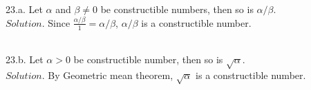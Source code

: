\documentclass[12pt]{book}
\begin{document}
\begin{CJK}{UTF8}{bsmi}
23.a. Let $\alpha$ and $\beta\ne0$ be constructible numbers, then so is $\alpha/\beta$. \\
$Solution$. Since $\frac{\alpha/\beta}{1}=\alpha/\beta$, $\alpha/\beta$ is a constructible number. \\
\begin{minipage}[t]{\dimexpr\linewidth-2em}
\begin{figure}[H] 
\centering 
{}
\end{figure}
\end{minipage}\\

23.b. Let $\alpha>0$ be constructible number, then so is $\sqrt{\alpha}$. \\
$Solution$. By Geometric mean theorem, $\sqrt{\alpha}$ is a constructible number. \\
\begin{minipage}[t]{\dimexpr\linewidth-2em}
\begin{figure}[H] 
\centering 
{}
\end{figure}
\end{minipage}\\

\end{CJK}
\end{document}
